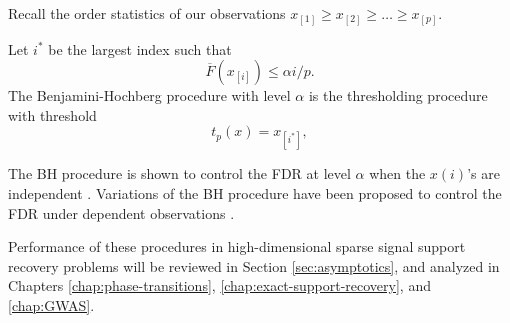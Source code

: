 Recall the order statistics of our observations $x_{[1]} \ge x_{[2]}  \ge \ldots \ge x_{[p]}$.
\begin{definition} \label{def:BH}
Let $i^*$ be the largest index such that
$$
\overline{F}(x_{[i]}) \le \alpha i/p.
$$
The Benjamini-Hochberg procedure with level $\alpha$ is the thresholding procedure with threshold
\begin{equation} \label{eq:BH-procedure}
    t_p(x) = x_{[i^*]},
\end{equation}
\end{definition}
The \ac{BH} procedure is shown to control the FDR at level $\alpha$ when the $x(i)$'s are independent \citep{benjamini1995controlling}.
Variations of the \ac{BH} procedure have been proposed to control the \ac{FDR} under dependent observations \citep{benjamini2001control}.


Performance of these procedures in high-dimensional sparse signal support recovery problems will be reviewed in Section \ref{sec:asymptotics}, and analyzed in Chapters \ref{chap:phase-transitions}, \ref{chap:exact-support-recovery}, and \ref{chap:GWAS}.
